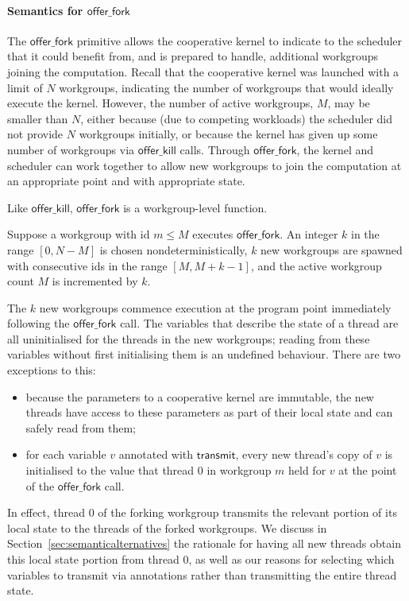 \documentclass[nocopyrightspace,10pt]{sigplanconf}
\newcommand{\transmit}{\mathsf{transmit}}
\newcommand{\offerfork}{\mathsf{offer\_fork}}
\newcommand{\offerkill}{\mathsf{offer\_kill}}
\begin{document}
\paragraph{Semantics for $\offerfork$}

The $\offerfork$ primitive allows the cooperative kernel to indicate
to the scheduler that it could benefit from, and is prepared to
handle, additional workgroups joining the computation.  Recall that
the cooperative kernel was launched with a limit of $N$ workgroups,
indicating the number of workgroups that would ideally execute the
kernel.  However, the number of active workgroups, $M$, may be smaller
than $N$, either because (due to competing workloads) the scheduler
did not provide $N$ workgroups initially, or because the kernel has
given up some number of workgroups via $\offerkill$ calls.  Through
$\offerfork$, the kernel and scheduler can work together to allow new
workgroups to join the computation at an appropriate point and with
appropriate state.

Like $\offerkill$, $\offerfork$ is a workgroup-level function.

Suppose a workgroup with id $m\leq M$ executes $\offerfork$.  An
integer $k$ in the range $[0, N-M]$ is chosen nondeterministically,
$k$ new workgroups are spawned with consecutive ids in the range $[M,
  M+k-1]$, and the active workgroup count $M$ is incremented by $k$.

The $k$ new workgroups commence execution at the program point
immediately following the $\offerfork$ call.  The variables that
describe the state of a thread are all uninitialised for the threads
in the new workgroups; reading from these variables without first
initialising them is an undefined behaviour.  There are two exceptions
to this:

\begin{itemize}

\item because the parameters to a cooperative kernel are immutable,
  the new threads have access to these parameters as part of their
  local state and can safely read from them;

\item for each variable $v$ annotated with $\transmit$, every new
  thread's copy of $v$ is initialised to the value that thread 0 in
  workgroup $m$ held for $v$ at the point of the $\offerfork$ call.

\end{itemize}

In effect, thread 0 of the forking workgroup transmits the relevant
portion of its local state to the threads of the forked workgroups.
We discuss in Section~\ref{sec:semanticalternatives} the rationale for
having all new threads obtain this local state portion from thread 0,
as well as our reasons for selecting which variables to transmit via
annotations rather than transmitting the entire thread state.
\end{document}

